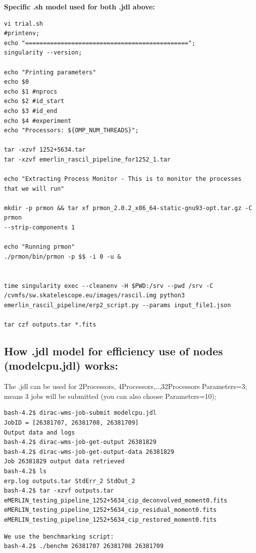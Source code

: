 \documentclass[english]{article}
\begin{document}
\hspace{4cm}

\textbf{Specific .sh model used for both .jdl above:} 
\begin{verbatim}
vi trial.sh
#printenv;
echo "==============================================";
singularity --version;

echo "Printing parameters"
echo $0
echo $1 #nprocs
echo $2 #id_start
echo $3 #id_end
echo $4 #experiment
echo "Processors: ${OMP_NUM_THREADS}";

tar -xzvf 1252+5634.tar
tar -xzvf emerlin_rascil_pipeline_for1252_1.tar

echo "Extracting Process Monitor - This is to monitor the processes that we will run"

mkdir -p prmon && tar xf prmon_2.0.2_x86_64-static-gnu93-opt.tar.gz -C prmon
--strip-components 1

echo "Running prmon"
./prmon/bin/prmon -p $$ -i 0 -u &


time singularity exec --cleanenv -H $PWD:/srv --pwd /srv -C
/cvmfs/sw.skatelescope.eu/images/rascil.img python3
emerlin_rascil_pipeline/erp2_script.py --params input_file1.json

tar czf outputs.tar *.fits
\end{verbatim}

\subsection{How .jdl model for efficiency use of nodes (modelcpu.jdl) works:}

The .jdl can be used for 2Processors, 4Processors,..,32Processors
Parameters=3; means 3 jobs will be submitted (you can also choose Parameters=10);
\newline
\begin{verbatim}
bash-4.2$ dirac-wms-job-submit modelcpu.jdl
JobID = [26381707, 26381708, 26381709]
Output data and logs
bash-4.2$ dirac-wms-job-get-output 26381829
bash-4.2$ dirac-wms-job-get-output-data 26381829
Job 26381829 output data retrieved
bash-4.2$ ls
erp.log outputs.tar StdErr_2 StdOut_2
bash-4.2$ tar -xzvf outputs.tar
eMERLIN_testing_pipeline_1252+5634_cip_deconvolved_moment0.fits
eMERLIN_testing_pipeline_1252+5634_cip_residual_moment0.fits
eMERLIN_testing_pipeline_1252+5634_cip_restored_moment0.fits
\end{verbatim}


\begin{verbatim}
We use the benchmarking script:
bash-4.2$ ./benchm 26381707 26381708 26381709
\end{verbatim}
\end{document}
